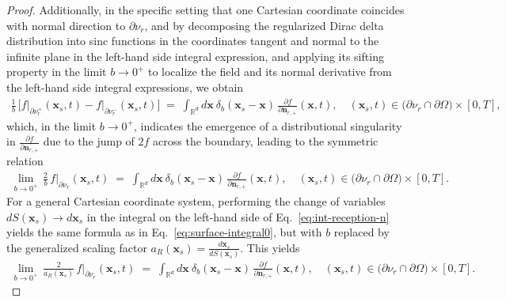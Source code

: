 \documentclass[10pt,a4paper]{amsart}
\newcommand{\bn}{\boldsymbol{n}}
\newcommand{\bx}{\boldsymbol{x}}
\begin{document}
\begin{proof}
Additionally, in the specific setting that one Cartesian coordinate coincides with normal direction to \( \partial \nu_r \), and by 
decomposing the regularized Dirac delta distribution into sinc functions in the coordinates tangent and normal to the infinite plane in the left-hand side integral expression, and applying its 
sifting property in the limit \(b \to 0^+\) to localize the field and its 
normal derivative from the left-hand side integral expressions, we obtain
\begin{align} \label{eq:surface-integral2}
  \frac{1}{b} \,
  \Big[ f \big|_{\partial \nu_r^+} (\bx_s, t)- f \big|_{\partial \nu_r^-} (\bx_s, t)\Big]
  \;=\;\int_{\mathbb{R}^d} d\bx \ \delta_b(\bx_s - \bx) \, 
  \frac{\partial f}{\partial \bn_{r,+}}(\bx, t), \quad (\bx_s, t) \in \big( \partial \nu_r \cap \partial \Omega \big) \times [0,T],
\end{align}
which, in the limit \( b \to 0^+ \), indicates the emergence of a 
distributional singularity in 
\( \tfrac{\partial f}{\partial \bn_{r,+}} \) 
due to the jump of \( 2 f \) across the boundary, leading to the symmetric relation
\begin{align} \label{eq:surface-integral0}
  \lim_{b \to 0^+} \, \frac{2}{b}\, f\big|_{\partial \nu_r} (\bx_s, t)
  \;=\;\int_{\mathbb{R}^d} d\bx \ \delta_b(\bx_s - \bx) \, 
  \frac{\partial f}{\partial \bn_{r,+}}(\bx, t), \quad (\bx_s, t) \in \big( \partial \nu_r \cap \partial \Omega \big) \times [0,T].
\end{align}
For a general Cartesian coordinate system, performing the change of variables \( dS(\bx_s) \to d \bx_s \) in the integral on the left-hand side of Eq.~\eqref{eq:int-reception-n} yields the same formula as in Eq.~\eqref{eq:surface-integral0}, but with \( b \) replaced by the generalized scaling factor \( a_R(\bx_s) = \frac{d \bx_s}{dS(\bx_s)} \). This yields
\begin{align} \label{eq:surface-integral}
  \lim_{b \to 0^+} \, \frac{2}{a_R(\bx_s)}\, f\big|_{\partial \nu_r} (\bx_s, t)
  \;=\;\int_{\mathbb{R}^d} d\bx \ \delta_b(\bx_s - \bx) \, 
  \frac{\partial f}{\partial \bn_{r,+}}(\bx, t), \quad (\bx_s, t) \in \big( \partial \nu_r \cap \partial \Omega \big) \times [0,T].
\end{align}


\end{proof}
\end{document}
